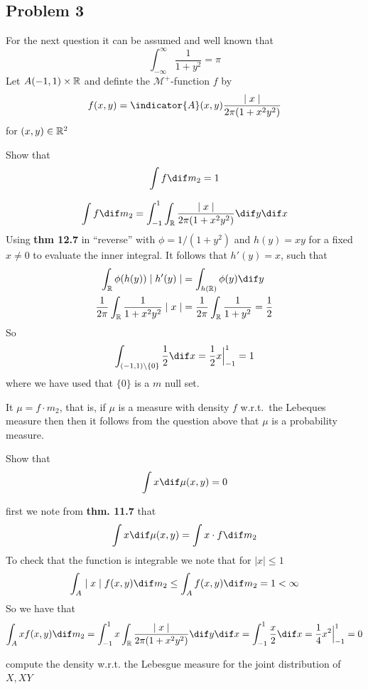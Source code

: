 \subsection{Problem 3} %
\label{sub:problem_3-2012}
For the next question it can be assumed and well known that
\[
	\int^{\infty}_{-\infty}\frac{1}{1+y^2}=\pi
\]
Let \(A(-1,1)\times{\mathbb{R}}\) and definte the \(\mathcal{M}^+\)-function \(f\) by
\[
	f(x,y)=\indicator{A}(x,y)\frac{\mid x\mid}{2\pi(1+x^2y^2)}
\]
for \((x,y)\in {\mathbb{R}}^2\)
\begin{problem}
Show that
\[
	\int f\dif m_2=1
\]
\end{problem}
\begin{solution}
\begin{align*}
\int f\dif m_2=\int_{-1}^1\int_{\R}\frac{\mid x\mid}{2\pi(1+x^2y^2)}\dif y\dif x
\end{align*}
Using \textbf{thm 12.7} in ``reverse'' with \(\phi=1/(1+y^2)\) and \(h(y)=xy\) for a fixed \(x\ne 0\) to evaluate the inner integral. It  follows that \(h'(y)=x\), such that
\begin{align}
    \int_\R \phi(h(y))\mid h'(y)\mid &  =\int_{h(\R)}\phi(y)\dif y \\
  \frac{1}{2\pi}\int_\R \frac{1}{1+x^2y^2}\mid x\mid & = \frac{1}{2\pi}\int_\R\frac{1}{1+y^2}=\frac{1}{2}
\end{align}
So
\[
	\int_{(-1,1)\setminus \{0\}}\frac{1}{2}\dif x=\frac{1}{2}x\Big|_{-1}^1=1
\]
where we have used that \(\{0\}\) is a \(m\) null set.
\end{solution}
It \(\mu=f\cdot m_2\), that is, if \(\mu\) is a measure with density \(f\)  w.r.t.\ the Lebeques measure then then it follows from  the question above that \(\mu\) is a probability measure.
\begin{problem}
Show that
\[
	\int x \dif \mu(x,y)=0
\]
\end{problem}
\begin{solution}
first we note from \textbf{thm. 11.7} that
\[
	\int x \dif \mu(x,y)=\int x\cdot f\dif m_2
\]
To check that the function is integrable we note that for \(\mid x\mid \leq1\)
\[
	\int_A \mid x\mid f(x,y)\dif m_2 \leq 	\int_A f(x,y)\dif m_2=1<\infty
\]
So we have that
\[
		\int_A  x f(x,y)\dif m_2=\int_{-1}^1   x \int_{\R}\frac{\mid x\mid}{2\pi(1+x^2y^2)}\dif y\dif x = \int_{-1}^1  \frac{x}{2}\dif x =\frac{1}{4}x^2\Big|_{-1}^1=0
\]

\end{solution}
\begin{problem}
compute the density w.r.t. the Lebesgue measure for the joint distribution of \(X,XY\)
\end{problem}
